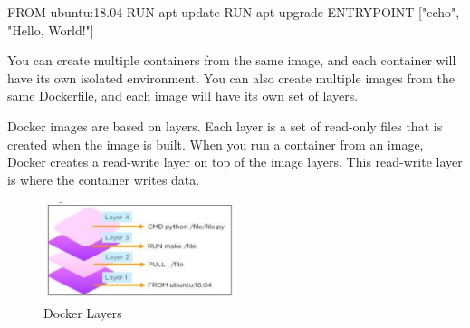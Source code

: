\begin{exampleblock}[Dockerfile]
    \begin{codeblock}[language=bash]
        FROM ubuntu:18.04
        RUN apt update
        RUN apt upgrade
        ENTRYPOINT ["echo", "Hello, World!"]
    \end{codeblock}
\end{exampleblock}

You can create multiple containers from the same image, and each container will
have its own isolated environment. You can also create multiple images from the
same Dockerfile, and each image will have its own set of layers.

Docker images are based on layers. Each layer is a set of read-only files that is
created when the image is built. When you run a container from an image, Docker
creates a read-write layer on top of the image layers. This read-write layer is
where the container writes data.

\begin{figure}[H]
    \centering
    \includegraphics[width=0.5\textwidth]{assets/fig39.png}
    \caption{Docker Layers}
\end{figure}




